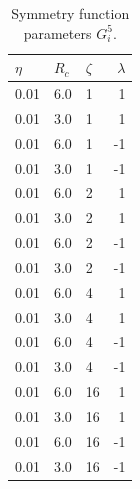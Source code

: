 \documentclass[twoside,english]{uiofysmaster}
\begin{document}
\begin{appendices}
\begin{table} 
  \begin{center}
    \begin{tabular*}{8cm}{l @{\extracolsep{\fill}} llr}
      \toprule
      $\eta$ & $R_c$ & $\zeta$ & $\lambda$\\ 
      \hline
      0.01 & 6.0 & 1 & 1 \\
      0.01 & 3.0 & 1 & 1 \\ 
      0.01 & 6.0 & 1 & -1 \\ 
      0.01 & 3.0 & 1 & -1 \\
      0.01 & 6.0 & 2 & 1 \\
      0.01 & 3.0 & 2 & 1 \\
      0.01 & 6.0 & 2 & -1 \\
      0.01 & 3.0 & 2 & -1 \\
      0.01 & 6.0 & 4 & 1 \\
      0.01 & 3.0 & 4 & 1 \\
      0.01 & 6.0 & 4 & -1 \\
      0.01 & 3.0 & 4 & -1 \\
      0.01 & 6.0 & 16 & 1 \\
      0.01 & 3.0 & 16 & 1 \\
      0.01 & 6.0 & 16 & -1 \\
      0.01 & 3.0 & 16 & -1 \\
      \bottomrule
      \end{tabular*} 
    \end{center}
    \captionsetup{width=12cm}
      \caption{Symmetry function parameters $G_i^5$.} 
  \label{tab:symmParamsInitialG5} 
\end{table}



\end{appendices}





\newpage
\end{document}
